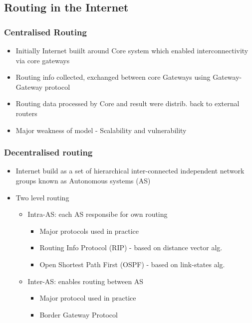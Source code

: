 \documentclass[a4paper]{article}
\begin{document}
\subsection{Routing in the Internet}
\subsubsection{Centralised Routing}
\begin{itemize}
	\item Initially Internet buiilt around Core system which enabled
		interconnectivity via core gateways
	\item Routing info collected, exchanged between core Gateways using
		Gateway-Gateway protocol
	\item Routing data processed by Core and result were distrib. back to
		external routers
	\item Major weakness of model - Scalability and vulnerability
\end{itemize}
\subsubsection{Decentralised routing}
\begin{itemize}
	\item Internet build as a set of hierarchical inter-connected
		independent network groups known as Autonomous systems (AS)
	\item Two level routing
	\begin{itemize}
		\item Intra-AS: each AS responsibe for own routing
		\begin{itemize}
			\item Major protocols used in practice
			\item Routing Info Protocol (RIP) - based on distance
				vector alg.
			\item Open Shortest Path First (OSPF) - based on
				link-states alg.
		\end{itemize}
		\item Inter-AS: enables routing between AS
		\begin{itemize}
			\item Major protocol used in practice
			\item Border Gateway Protocol
		\end{itemize}
	\end{itemize}
\end{itemize}
\end{document}
